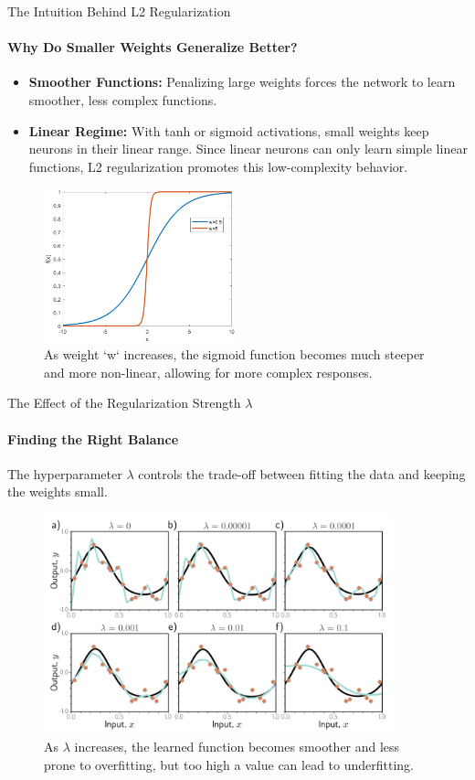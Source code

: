 \begin{frame}{The Intuition Behind L2 Regularization}
    \framesubtitle{Why Do Smaller Weights Generalize Better?}
    \begin{itemize}
        \item \textbf{Smoother Functions:} Penalizing large weights forces the network to learn smoother, less complex functions.
        \item \textbf{Linear Regime:} With tanh or sigmoid activations, small weights keep neurons in their linear range. Since linear neurons can only learn simple linear functions, L2 regularization promotes this low-complexity behavior.
    \end{itemize}
    \begin{figure}
        \includegraphics[width=0.5\textwidth]{images/sigmoid_l2.png}
        \caption{As weight `w` increases, the sigmoid function becomes much steeper and more non-linear, allowing for more complex responses.}
    \end{figure}
\end{frame}

\begin{frame}{The Effect of the Regularization Strength $\lambda$}
    \framesubtitle{Finding the Right Balance}
    The hyperparameter $\lambda$ controls the trade-off between fitting the data and keeping the weights small.
    \begin{figure}
        \includegraphics[width=0.9\textwidth]{images/lambda_effect.png}
        \caption{As $\lambda$ increases, the learned function becomes smoother and less prone to overfitting, but too high a value can lead to underfitting.}
    \end{figure}
\end{frame}


